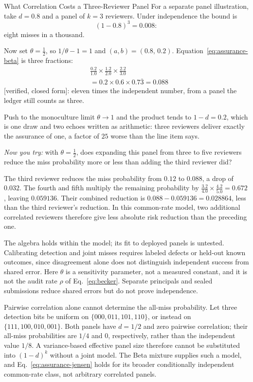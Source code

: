 \documentclass[11pt,a4paper]{article}
\theoremstyle{definition}
\theoremstyle{definition}
\theoremstyle{remark}
\begin{document}
\begin{pdexample}{What Correlation Costs a Three-Reviewer Panel}
\setlength{\parskip}{4pt plus 1pt}
For a separate panel illustration, take $d = 0.8$ and a panel of $k=3$ reviewers. Under
independence the bound is \[
(1-0.8)^3 = 0.008:
\] eight misses in a thousand.

Now set $\theta = \tfrac12$, so $1/\theta - 1 = 1$ and $(a,b) = (0.8,\,0.2)$.
Equation~\ref{eq:assurance-beta} is three fractions:
\[
\begin{aligned}
&\tfrac{0.2}{1.0}\times\tfrac{1.2}{2.0}\times\tfrac{2.2}{3.0}\\
&= 0.2 \times 0.6 \times 0.7\overline{3} = 0.088
\end{aligned}
\] [verified, closed form]: eleven
times the independent number, from a panel the ledger still counts as three.

Push to the monoculture limit $\theta \to 1$ and the product tends to $1-d = 0.2$,
which is one draw and two echoes written as arithmetic: three
reviewers deliver exactly the assurance of one, a factor of $25$ worse than the
line item says.

\emph{Now you try:} with $\theta=\tfrac12$, does expanding this panel
from three to five reviewers reduce the miss probability more or less than
adding the third reviewer did?

The third reviewer reduces the miss probability from $0.12$ to $0.088$,
a drop of $0.032$. The fourth and fifth multiply the remaining probability by
$\tfrac{3.2}{4.0}\times\tfrac{4.2}{5.0}=0.672$, leaving $0.059136$.
Their combined reduction is $0.088-0.059136=0.028864$, less than the third
reviewer's reduction. In this common-rate model, two additional correlated
reviewers therefore give less absolute risk reduction than the preceding one.
\end{pdexample}

The algebra holds within the model; its fit to deployed panels is untested.
Calibrating detection and joint misses requires labeled defects or held-out
known outcomes, since disagreement alone does not distinguish independent
success from shared error. Here $\theta$ is a sensitivity parameter, not a
measured constant, and it is not the audit rate $\rho$ of Eq.~\ref{eq:becker}.
Separate principals and sealed submissions reduce shared errors but do not
prove independence.

\pdpairwisecounterexample
Pairwise correlation alone cannot determine the all-miss probability. Let three detection
bits be uniform on $\{000,011,101,110\}$, or instead on
$\{111,100,010,001\}$. Both panels have $d=1/2$ and zero pairwise correlation;
their all-miss probabilities are $1/4$ and $0$, respectively, rather than the
independent value $1/8$. A variance-based effective panel size therefore
cannot be substituted into $(1-d)^k$ without a joint model. The Beta mixture
supplies such a model, and Eq.~\ref{eq:assurance-jensen} holds for its broader
conditionally independent common-rate class, not arbitrary correlated panels.
\end{document}
